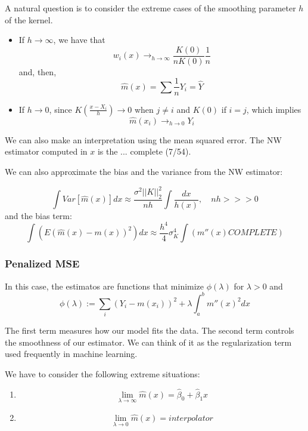 A natural question is to consider the extreme cases of the smoothing parameter \(h\) of the kernel.
\begin{itemize}
\item If \(h \to \infty\), we have that
\[
w_i(x) \to_{h \to \infty} \frac{K(0)}{nK(0)} \frac{1}{n}
\]
and, then,
\[
\hat m(x) = \sum \frac{1}{n} Y_i = \hat Y
\]

\item If \(h \to 0\), since \( K \left(\frac{x-X_i}{h}\right) \to 0\) when \(j \neq i\) and \(K(0)\) if \(i = j\), which implies
\[
\hat m(x_i) \to_{h \to 0} Y_i
\]
\end{itemize}

We can also make an interpretation using the mean squared error. The NW estimator computed in \(x\) is the ... complete (7/54).


We can also approximate the bias and the variance from the NW estimator:

\begin{nprop}
  \[
    \int Var [\hat m(x)] dx \approx \frac{\sigma^2 ||K||_2^2}{nh} \int \frac{dx}{h(x)}, \quad nh >>> 0
  \]
  and the bias term:
  \[
    \int (E(\hat m(x) - m(x))^{2})dx \approx \frac{h^{4}}{4}\sigma_{K}^{4} \int \left( m''(x) COMPLETE\right)
  \]

\end{nprop}

\subsubsection{Penalized MSE}

In this case, the estimatos are functions that minimize \(\phi(\lambda)\) for \(\lambda > 0\) and
\[
\phi(\lambda):= \sum_{i}(Y_{i} - m(x_{i}))^{2} + \lambda \int_{a}^{b} m''(x)^{2} dx
\]

The first term measures how our model fits the data. The second term controls the smoothness of our estimator. We can think of it as the regularization term used frequently in machine learning.

We have to consider the following extreme situations:

\begin{enumerate}
  \item \[
        \lim_{\lambda \to \infty} \hat m(x) = \hat \beta_{0} + \hat \beta_{1}x
        \]
  \item
        \[
        \lim_{\lambda \to 0} \hat m(x) = interpolator
        \]
\end{enumerate}

